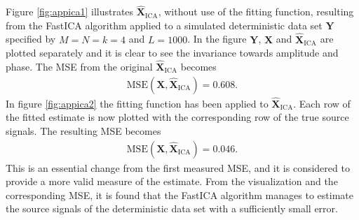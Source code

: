 Figure \ref{fig:appica1} illustrates $\hat{\mathbf{X}}_{\text{ICA}}$, without use of the fitting function, resulting from the FastICA algorithm applied to a simulated deterministic data set $\mathbf{Y}$ specified by $M = N = k = 4$ and $L = 1000$. 
In the figure $\mathbf{Y}$, $\mathbf{X}$ and $\hat{\mathbf{X}}_{\text{ICA}}$ are plotted separately and it is clear to see the invariance towards amplitude and phase.
The MSE from the original $\hat{\mathbf{X}}_{\text{ICA}}$ becomes
\begin{align*}
\text{MSE}(\mathbf{X}, \hat{\mathbf{X}}_{\text{ICA}}) = 0.608.
\end{align*}
In figure \ref{fig:appica2} the fitting function has been applied to $\hat{\mathbf{X}}_{\text{ICA}}$. Each row of the fitted estimate is now plotted with the corresponding row of the true source signals. 
The resulting MSE becomes 
\begin{align*}
\text{MSE}(\mathbf{X}, \hat{\mathbf{X}}_{\text{ICA}}) = 0.046.
\end{align*}  
This is an essential change from the first measured MSE, and it is considered to provide a more valid measure of the estimate. 
From the visualization and the corresponding MSE, it is found that the FastICA algorithm manages to estimate the source signals of the deterministic data set with a sufficiently small error. 
